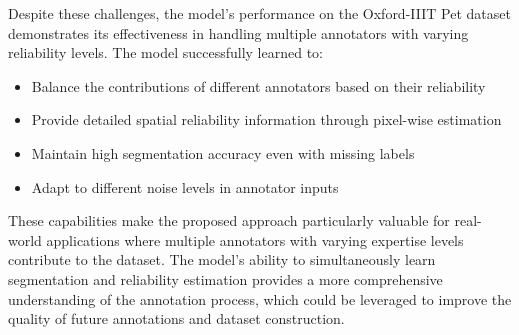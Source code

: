 Despite these challenges, the model's performance on the Oxford-IIIT
Pet dataset demonstrates its effectiveness in handling multiple
annotators with varying reliability levels. The model
successfully learned to:
\begin{itemize}
  \item Balance the contributions of different annotators based on
    their reliability
  \item Provide detailed spatial reliability information through
    pixel-wise estimation
  \item Maintain high segmentation accuracy even with missing labels
  \item Adapt to different noise levels in annotator inputs
\end{itemize}

These capabilities make the proposed approach particularly valuable
for real-world applications where multiple annotators with varying
expertise levels contribute to the dataset. The model's ability to
simultaneously learn segmentation and reliability estimation provides
a more comprehensive understanding of the annotation process, which
could be leveraged to improve the quality of future annotations and
dataset construction.